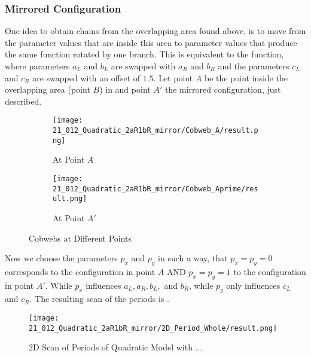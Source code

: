 \subsubsection{Mirrored Configuration}

One idea to obtain chains from the overlapping area found above, is to move from the parameter values that are inside this area to parameter values that produce the same function rotated by one branch.
This is equivalent to the function, where parameters $a_L$ and $b_L$ are swapped with $a_R$ and $b_R$ and the parameters $c_L$ and $c_R$ are swapped with an offset of $1.5$.
Let point $A$ be the point inside the overlapping area (point $B$) in  and point $A'$ the mirrored configuration, just described.

\begin{figure}
    \centering
    \begin{subfigure}{0.4\textwidth}
        \centering
        \texttt{[image: 21\_012\_Quadratic\_2aR1bR\_mirror/Cobweb\_A/result.png]}
        \caption{At Point $A$}
        \label{fig:quad.full.2aR1bR_cL_mirr.1.CobwebA}
    \end{subfigure}
    \begin{subfigure}{0.4\textwidth}
        \centering
        \texttt{[image: 21\_012\_Quadratic\_2aR1bR\_mirror/Cobweb\_Aprime/result.png]}
        \caption{At Point $A'$}
        \label{fig:quad.full.2aR1bR_cL_mirr.1.CobwebAprime}
    \end{subfigure}
    \caption{Cobwebs at Different Points}
    \label{fig:quad.full.2aR1bR_cL_mirr.1.Cobwebsprime}
\end{figure}

Now we choose the parameters $p_x$ and $p_y$ in such a way, that $p_x = p_y = 0$ corresponds to the configuration in point $A$ AND $p_x = p_y = 1$ to the configuration in point $A'$.
While $p_x$ influences $a_L, a_R, b_L,$ and $b_R$, while $p_y$ only influences $c_L$ and $c_R$.
The resulting scan of the periods is .

\begin{figure}
    \centering
    \texttt{[image: 21\_012\_Quadratic\_2aR1bR\_mirror/2D\_Period\_Whole/result.png]}
    \caption{2D Scan of Periods of Quadratic Model with ...}
    \label{fig:quadratic.full.2aR1bR_mirr.1.2d.whole}
\end{figure}

